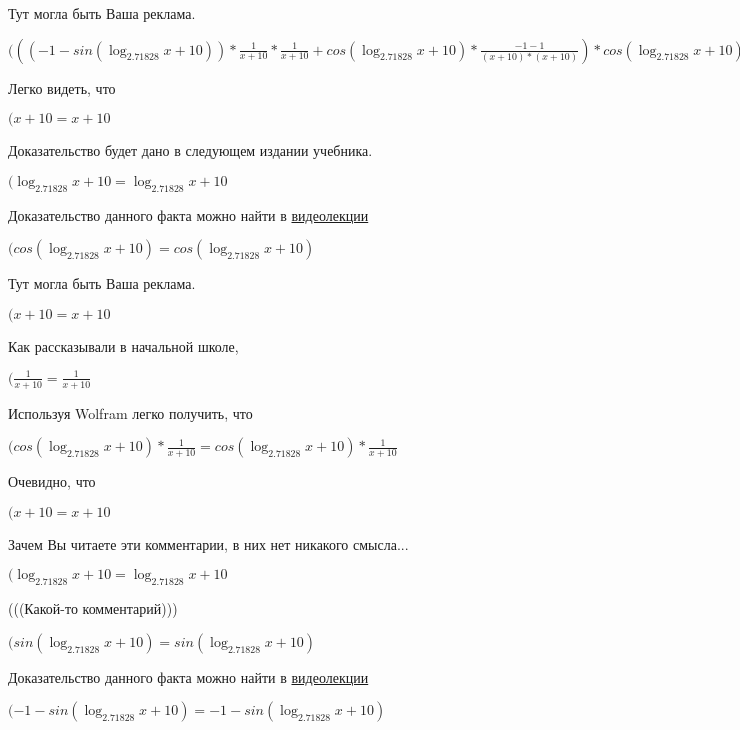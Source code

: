 \documentclass[12pt,a4paper,fleqn]{article}
\theoremstyle{definition}
\begin{document}
Тут могла быть Ваша реклама.

$((( -1  - sin(\log_{ 2.71828 }{ x  +  10 })) * \frac{ 1 }{ x  +  10 }
 * \frac{ 1 }{ x  +  10 }
 + cos(\log_{ 2.71828 }{ x  +  10 }) * \frac{ -1  -  1 }{( x  +  10 ) * ( x  +  10 )}
) * cos(\log_{ 2.71828 }{ x  +  10 }) * \frac{ 1 }{ x  +  10 }
 * { 3 }^{sin(\log_{ 2.71828 }{ x  +  10 })} = (( -1  - sin(\log_{ 2.71828 }{ x  +  10 })) * \frac{ 1 }{ x  +  10 }
 * \frac{ 1 }{ x  +  10 }
 + cos(\log_{ 2.71828 }{ x  +  10 }) * \frac{ -1  -  1 }{( x  +  10 ) * ( x  +  10 )}
) * cos(\log_{ 2.71828 }{ x  +  10 }) * \frac{ 1 }{ x  +  10 }
 * { 3 }^{sin(\log_{ 2.71828 }{ x  +  10 })}$

Легко видеть, что

$( x  +  10  =  x  +  10 $

Доказательство будет дано в следующем издании учебника.

$(\log_{ 2.71828 }{ x  +  10 } = \log_{ 2.71828 }{ x  +  10 }$

Доказательство данного факта можно найти в \href{https://www.youtube.com/watch?v=dQw4w9WgXcQ}{видеолекции}

$(cos(\log_{ 2.71828 }{ x  +  10 }) = cos(\log_{ 2.71828 }{ x  +  10 })$

Тут могла быть Ваша реклама.

$( x  +  10  =  x  +  10 $

Как рассказывали в начальной школе,

$(\frac{ 1 }{ x  +  10 }
 = \frac{ 1 }{ x  +  10 }
$

Используя Wolfram легко получить, что

$(cos(\log_{ 2.71828 }{ x  +  10 }) * \frac{ 1 }{ x  +  10 }
 = cos(\log_{ 2.71828 }{ x  +  10 }) * \frac{ 1 }{ x  +  10 }
$

Очевидно, что

$( x  +  10  =  x  +  10 $

Зачем Вы читаете эти комментарии, в них нет никакого смысла...

$(\log_{ 2.71828 }{ x  +  10 } = \log_{ 2.71828 }{ x  +  10 }$

(((Какой-то комментарий)))

$(sin(\log_{ 2.71828 }{ x  +  10 }) = sin(\log_{ 2.71828 }{ x  +  10 })$

Доказательство данного факта можно найти в \href{https://www.youtube.com/watch?v=dQw4w9WgXcQ}{видеолекции}

$( -1  - sin(\log_{ 2.71828 }{ x  +  10 }) =  -1  - sin(\log_{ 2.71828 }{ x  +  10 })$
\end{document}
